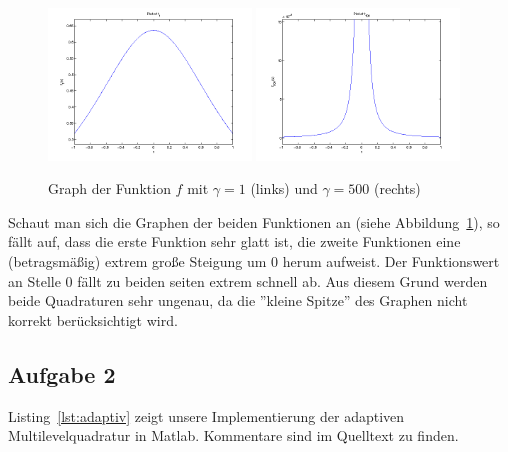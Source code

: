 \documentclass[11pt,a4paper,ngerman]{article}
\begin{document}
\begin{figure}[h!]
\centering
\includegraphics[width=0.48\textwidth]{f1.png}
\includegraphics[width=0.48\textwidth]{f2.png}
\caption{Graph der Funktion $f$ mit $\gamma = 1$ (links) und $\gamma = 500$ (rechts) \label{fig:f}}
\end{figure}

Schaut man sich die Graphen der beiden Funktionen an (siehe Abbildung~\ref{fig:f}), so fällt auf, dass die erste Funktion sehr glatt ist, die zweite Funktionen eine (betragsmäßig) extrem große Steigung um 0 herum aufweist. Der Funktionswert an Stelle 0 fällt zu beiden seiten extrem schnell ab. Aus diesem Grund werden beide Quadraturen sehr ungenau, da die ''kleine Spitze'' des Graphen nicht korrekt berücksichtigt wird.

\subsection*{Aufgabe 2}

Listing~\ref{lst:adaptiv} zeigt unsere Implementierung der adaptiven Multilevelquadratur in Matlab.
Kommentare sind im Quelltext zu finden.
\end{document}
